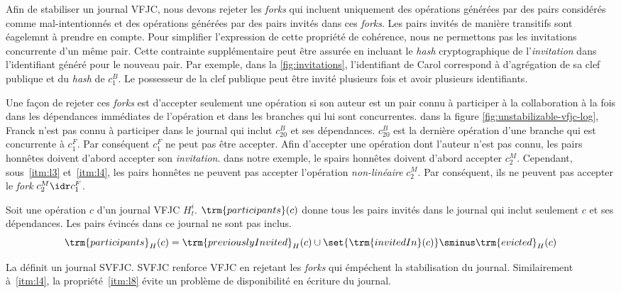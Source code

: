 Afin de stabiliser un journal \ac{VFJC}, nous devons rejeter les \emph{forks} qui incluent uniquement des opérations générées par des pairs considérés comme mal-intentionnés et des opérations générées par des pairs invités dans ces \emph{forks}.
Les pairs invités de manière transitifs sont éagelemnt à prendre en compte.
Pour simplifier l'expression de cette propriété de cohérence, nous ne permettons pas les invitations concurrente d'un même pair.
Cette contrainte supplémentaire peut être assurée en incluant le \emph{hash} cryptographique de l'\emph{invitation} dans l'identifiant généré pour le nouveau pair.
Par exemple, dans la \autoref{fig:invitations}, l'identifiant de Carol correspond à d'agrégation de sa clef publique et du \emph{hash} de $c^B_1$.
Le possesseur de la clef publique peut être invité plusieurs fois et avoir plusieurs identifiants.

Une façon de rejeter ces \emph{forks} est d'accepter seulement une opération si son auteur est un pair connu à participer à la collaboration à la fois dans les dépendances immédiates de l'opération et dans les branches qui lui sont concurrentes.
dans la figure \autoref{fig:unstabilizable-vfjc-log}, Franck n'est pas connu à participer dans le journal qui inclut $c^B_20$ et ses dépendances.
$c^B_20$ est la dernière opération d'une branche qui est concurrente à $c^F_1$.
Par conséquent $c^F_1$ ne peut pas être accepter.
Afin d'accepter une opération dont l'auteur n'est pas connu, les pairs honnêtes doivent d'abord accepter son \emph{invitation}.
dans notre exemple, le spairs honnêtes doivent d'abord accepter $c^M_2$.
Cependant, sous~\ref{itm:l3} et~\ref{itm:l4}, les pairs honnêtes ne peuvent pas accepter l'opération \emph{non-linéaire} $c^M_2$.
Par conséquent, ils ne peuvent pas accepter le \emph{fork} $c^M_2 \idr c^F_1$.

\begin{definition}\label{def:known-participants}
Soit une opération $c$ d'un journal \ac{VFJC} $H^i_t$.
$\trm{participants}(c)$ donne tous les pairs invités dans le journal qui inclut seulement $c$ et ses dépendances.
Les pairs évincés dans ce journal ne sont pas inclus.
\begin{equation*}
\trm{participants}_H(c) = \trm{previouslyInvited}_H(c) \cup \set{\trm{invitedIn}(c)} \sminus \trm{evicted}_H(c)
\end{equation*}
\end{definition}

La  définit un journal \acf{SVFJC}. \ac{SVFJC} renforce \ac{VFJC} en rejetant les \emph{forks} qui émpéchent la stabilisation du journal.
Similairement à~\ref{itm:l4}, la propriété~\ref{itm:l8} évite un problème de disponibilité en écriture du journal.

